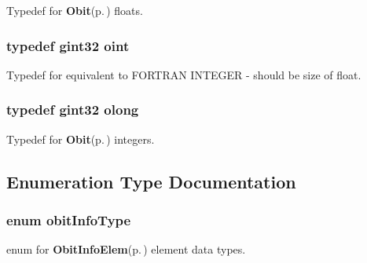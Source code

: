 Typedef for {\bf Obit}{\rm (p.\,\pageref{structObit})} floats. 

\subsubsection{\setlength{\rightskip}{0pt plus 5cm}typedef gint32 {\bf oint}}\label{ObitTypes_8h_a4}


Typedef for equivalent to FORTRAN INTEGER - should be size of float. 

\subsubsection{\setlength{\rightskip}{0pt plus 5cm}typedef gint32 {\bf olong}}\label{ObitTypes_8h_a5}


Typedef for {\bf Obit}{\rm (p.\,\pageref{structObit})} integers. 



\subsection{Enumeration Type Documentation}
\subsubsection{\setlength{\rightskip}{0pt plus 5cm}enum {\bf obit\-Info\-Type}}\label{ObitTypes_8h_a55}


enum for {\bf Obit\-Info\-Elem}{\rm (p.\,\pageref{structObitInfoElem})} element data types. 

